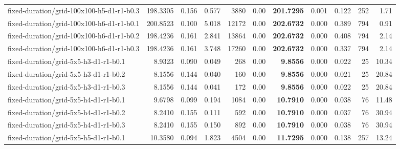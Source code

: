 \documentclass[10pt]{article}
\begin{document}
\begin{tabular}{p{65mm}rrrrrrrrrr}
fixed-\allowbreak duration/\allowbreak grid-\allowbreak 100x100-\allowbreak h5-\allowbreak d1-\allowbreak r1-\allowbreak b0.3 & 198.3305 & 0.156 & 0.577 & 3880 & 0.00 & \textbf{201.7295} & 0.001 & 0.122 & 252 & 1.71 \\
fixed-\allowbreak duration/\allowbreak grid-\allowbreak 100x100-\allowbreak h6-\allowbreak d1-\allowbreak r1-\allowbreak b0.1 & 200.8523 & 0.100 & 5.018 & 12172 & 0.00 & \textbf{202.6732} & 0.000 & 0.389 & 794 & 0.91 \\
fixed-\allowbreak duration/\allowbreak grid-\allowbreak 100x100-\allowbreak h6-\allowbreak d1-\allowbreak r1-\allowbreak b0.2 & 198.4236 & 0.161 & 2.841 & 13864 & 0.00 & \textbf{202.6732} & 0.000 & 0.408 & 794 & 2.14 \\
fixed-\allowbreak duration/\allowbreak grid-\allowbreak 100x100-\allowbreak h6-\allowbreak d1-\allowbreak r1-\allowbreak b0.3 & 198.4236 & 0.161 & 3.748 & 17260 & 0.00 & \textbf{202.6732} & 0.000 & 0.337 & 794 & 2.14 \\
fixed-\allowbreak duration/\allowbreak grid-\allowbreak 5x5-\allowbreak h3-\allowbreak d1-\allowbreak r1-\allowbreak b0.1 & 8.9323 & 0.090 & 0.049 & 268 & 0.00 & \textbf{9.8556} & 0.000 & 0.022 & 25 & 10.34 \\
fixed-\allowbreak duration/\allowbreak grid-\allowbreak 5x5-\allowbreak h3-\allowbreak d1-\allowbreak r1-\allowbreak b0.2 & 8.1556 & 0.144 & 0.040 & 160 & 0.00 & \textbf{9.8556} & 0.000 & 0.021 & 25 & 20.84 \\
fixed-\allowbreak duration/\allowbreak grid-\allowbreak 5x5-\allowbreak h3-\allowbreak d1-\allowbreak r1-\allowbreak b0.3 & 8.1556 & 0.144 & 0.041 & 172 & 0.00 & \textbf{9.8556} & 0.000 & 0.022 & 25 & 20.84 \\
fixed-\allowbreak duration/\allowbreak grid-\allowbreak 5x5-\allowbreak h4-\allowbreak d1-\allowbreak r1-\allowbreak b0.1 & 9.6798 & 0.099 & 0.194 & 1084 & 0.00 & \textbf{10.7910} & 0.000 & 0.038 & 76 & 11.48 \\
fixed-\allowbreak duration/\allowbreak grid-\allowbreak 5x5-\allowbreak h4-\allowbreak d1-\allowbreak r1-\allowbreak b0.2 & 8.2410 & 0.155 & 0.111 & 592 & 0.00 & \textbf{10.7910} & 0.000 & 0.037 & 76 & 30.94 \\
fixed-\allowbreak duration/\allowbreak grid-\allowbreak 5x5-\allowbreak h4-\allowbreak d1-\allowbreak r1-\allowbreak b0.3 & 8.2410 & 0.155 & 0.150 & 892 & 0.00 & \textbf{10.7910} & 0.000 & 0.038 & 76 & 30.94 \\
fixed-\allowbreak duration/\allowbreak grid-\allowbreak 5x5-\allowbreak h5-\allowbreak d1-\allowbreak r1-\allowbreak b0.1 & 10.3580 & 0.094 & 1.823 & 4504 & 0.00 & \textbf{11.7295} & 0.000 & 0.138 & 257 & 13.24 \\

\end{tabular}
\end{document}
